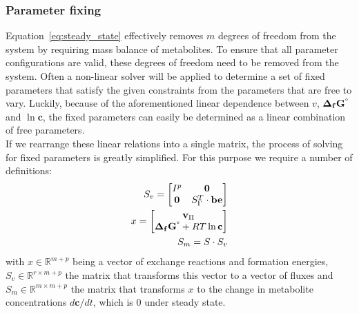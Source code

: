 \documentclass[10pt,letterpaper]{article}
\newcommand{\sdgf}{\Delta_fG^{\degree}}
\newcommand{\bsdgf}{\mathbf{\sdgf}}
\newcommand{\bc}{\mathbf{c}}
\newcommand{\bv}{\mathbf{v}}
\newcommand{\bbe}{\mathbf{be}}
\begin{document}
\subsubsection{Parameter fixing}
Equation~\ref{eq:steady_state} effectively removes $m$ degrees of freedom from the system by requiring mass balance of metabolites.
To ensure that all parameter configurations are valid, these degrees of freedom need to be removed from the system.
Often a non-linear solver will be applied to determine a set of fixed parameters that satisfy the given constraints from the parameters that are free to vary. %
Luckily, because of the aforementioned linear dependence between $v$, $\bsdgf$ and $\ln{\bc}$, the fixed parameters can easily be determined as a linear combination of free parameters.
\\
If we rearrange these linear relations into a single matrix, the process of solving for fixed parameters is greatly simplified.
For this purpose we require a number of definitions:
\begin{align}
    S_v = \begin{bmatrix}
             I^p & \mathbf{0} \\
             \mathbf{0} & S_{\Gamma}^T \cdot \bbe\\
          \end{bmatrix} \\
    x = \begin{bmatrix}
            \bv_{\Pi} \\
            \bsdgf + RT\ln{\bc}\\ %
        \end{bmatrix} \\
    S_m = S \cdot S_v\\
\end{align}
with $x \in \mathbb{R}^{m+p}$ being a vector of exchange reactions and formation energies, $S_v \in \mathbb{R}^{r \times m+p}$
 the matrix that transforms this vector to a vector of fluxes and $S_m \in \mathbb{R}^{m \times m+p}$ the matrix that
 transforms $x$ to the change in metabolite concentrations $d\bc/dt$, which is 0 under steady state.
\end{document}
